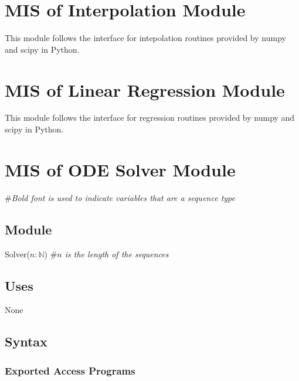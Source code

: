 \documentclass[12pt, titlepage]{article}
\begin{document}
\newpage

\section{MIS of Interpolation Module} \label{interp} 

This module follows the interface for intepolation routines provided by numpy and scipy in Python.

\newpage

\section{MIS of Linear Regression Module} \label{LinerReg}

This module follows the interface for regression routines provided by numpy and scipy in Python.

\newpage

\section{MIS of ODE Solver Module} \label{ODE}

\#\textit{Bold font is used to indicate variables that are a sequence
  type}

\subsection{Module}

Solver($n: \mathbb{N}$) \#\textit{$n$ is the length of the sequences}

\subsection{Uses}

None

\subsection{Syntax}

\subsubsection{Exported Access Programs}
\end{document}
